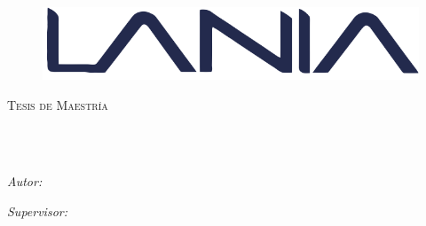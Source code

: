 \documentclass[
12pt, %
spanish, %
singlespacing, %
headsepline, %
]{MastersDoctoralThesis} %
\author{Ing. Roides J. Cruz Lara} %
\theoremstyle{plain}
\theoremstyle{definition}
\begin{document}
\frontmatter %

\pagestyle{plain} %


\begin{titlepage}
\begin{center}
		\vspace*{-1in}	
			
			\begin{figure}[htb]
			\begin{center}
			\includegraphics[width=0.6\linewidth]{Figures/logolania}
			\end{center}
			\end{figure}
         
{\scshape\LARGE \univname\par}\vspace{2.4cm} %
\textsc{\Large Tesis de Maestría}\\[0.5cm] %

\HRule \\[0.4cm] %
{\huge \bfseries \ttitle\par}\vspace{0.4cm} %
\HRule \\[1.5cm] %
 
\begin{minipage}[t]{0.4\textwidth}
\begin{flushleft} \large
\emph{Autor:}\\
\href{https://roydes.github.io/about/}{\authorname} %
\end{flushleft}
\end{minipage}
\begin{minipage}[t]{0.4\textwidth}
\begin{flushright} \large
\emph{Supervisor:} \\
\href{https://www.uv.mx/personal/emezura/}{\supnameI} %
\centering 


\end{flushright}
\end{minipage}
\end{center}
\end{titlepage}
\end{document}

